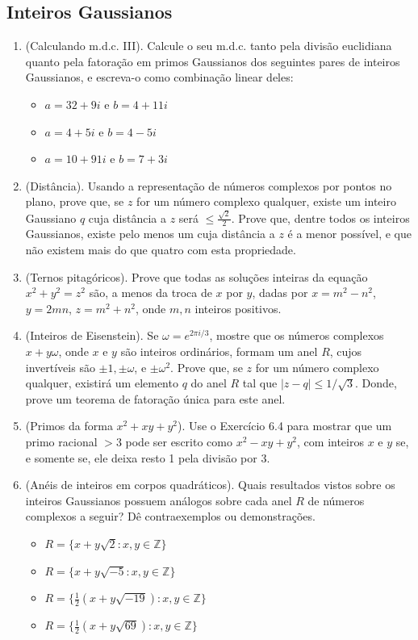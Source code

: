 \subsection{Inteiros Gaussianos}

\begin{enumerate}[label=6.\arabic*.]
    \item (Calculando m.d.c. III). Calcule o seu m.d.c. tanto pela divisão euclidiana quanto pela fatoração em primos Gaussianos dos seguintes pares de inteiros Gaussianos, e escreva-o como combinação linear deles:
    \begin{itemize}
        \item[(i)] $a = 32 + 9i$ e $b = 4 + 11i$
        \item[(ii)] $a = 4 + 5i$ e $b = 4 - 5i$
        \item[(iii)] $a = 10 + 91i$ e $b = 7 + 3i$
    \end{itemize}
    \item (Distância). Usando a representação de números complexos por pontos no plano, prove que, se $z$ for um número complexo qualquer, existe um inteiro Gaussiano $q$ cuja distância a $z$ será $ \leq \frac{\sqrt{2}}{2}$. Prove que, dentre todos os inteiros Gaussianos, existe pelo menos um cuja distância a $z$ é a menor possível, e que não existem mais do que quatro com esta propriedade.
    \item (Ternos pitagóricos). Prove que todas as soluções inteiras da equação $x^2 + y^2 = z^2$ são, a menos da troca de $x$ por $y$, dadas por $x = m^2 - n^2$, $y = 2mn$, $z = m^2 + n^2$, onde $m, n$ inteiros positivos.
    \item (Inteiros de Eisenstein). Se $\omega = e^{2 \pi i /3}$, mostre que os números complexos $x + y\omega$, onde $x$ e $y$ são inteiros ordinários, formam um anel $R$, cujos invertíveis são $\pm 1, \pm \omega$, e $\pm \omega^2$. Prove que, se $z$ for um número complexo qualquer, existirá um elemento $q$ do anel $R$ tal que $|z - q| \leq 1/\sqrt{3}$. Donde, prove um teorema de fatoração única para este anel.
    \item (Primos da forma $x^2 + xy + y^2$). Use o Exercício 6.4 para mostrar que um primo racional $> 3$ pode ser escrito como $x^2-xy+y^2$, com inteiros $x$ e $y$ se, e somente se, ele deixa resto 1 pela divisão por 3.
    \item (Anéis de inteiros em corpos quadráticos). Quais resultados vistos sobre os inteiros Gaussianos possuem análogos sobre cada anel $R$ de números complexos a seguir? Dê contraexemplos ou demonstrações.
    \begin{itemize}
        \item[(i)] $R = \{ x + y \sqrt{2} : x, y \in \mathbb{Z} \}$
        \item[(ii)] $R = \{ x + y \sqrt{-5}  : x, y \in \mathbb{Z} \}$
        \item[(iii)] $R = \{ \frac{1}{2}(x + y\sqrt{-19}) : x, y \in \mathbb{Z} \}$
        \item[(iv)] $R = \{ \frac{1}{2}(x + y\sqrt{69}) : x, y \in \mathbb{Z} \}$
    \end{itemize}
\end{enumerate}
